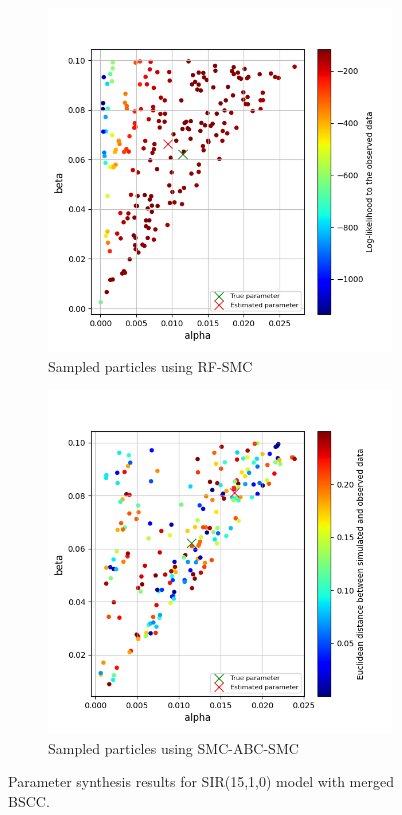 \begin{figure}[H]
    \centering
    \begin{subfigure}{0.48\textwidth}
        \centering
        \includegraphics[width=\linewidth]{figures/sir1510_merged_bscc_rfsmc.png}
        \caption{Sampled particles using RF-SMC}
    \end{subfigure}
    \hfill
    \begin{subfigure}{0.48\textwidth}
        \centering
        \includegraphics[width=\linewidth]{figures/sir1510_merged_bscc_abcsmc.png}
        \caption{Sampled particles using SMC-ABC-SMC}
    \end{subfigure}
    \caption{Parameter synthesis results for SIR(15,1,0) model with merged BSCC.}
\end{figure}

